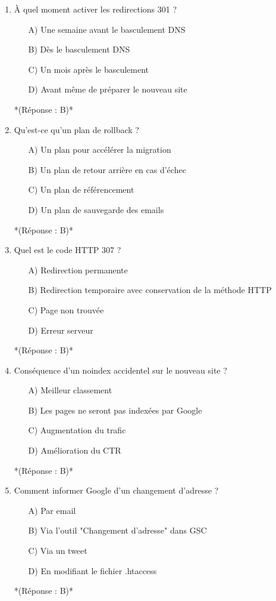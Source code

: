 \documentclass[12pt,a4paper,twoside]{report}
\begin{document}
\begin{enumerate}
\item À quel moment activer les redirections 301 ?
\begin{itemize}
\item[A)] Une semaine avant le basculement DNS
\item[B)] Dès le basculement DNS
\item[C)] Un mois après le basculement
\item[D)] Avant même de préparer le nouveau site
\end{itemize}
*(Réponse : B)*

\item Qu'est-ce qu'un plan de rollback ?
\begin{itemize}
\item[A)] Un plan pour accélérer la migration
\item[B)] Un plan de retour arrière en cas d'échec
\item[C)] Un plan de référencement
\item[D)] Un plan de sauvegarde des emails
\end{itemize}
*(Réponse : B)*

\item Quel est le code HTTP 307 ?
\begin{itemize}
\item[A)] Redirection permanente
\item[B)] Redirection temporaire avec conservation de la méthode HTTP
\item[C)] Page non trouvée
\item[D)] Erreur serveur
\end{itemize}
*(Réponse : B)*

\item Conséquence d'un noindex accidentel sur le nouveau site ?
\begin{itemize}
\item[A)] Meilleur classement
\item[B)] Les pages ne seront pas indexées par Google
\item[C)] Augmentation du trafic
\item[D)] Amélioration du CTR
\end{itemize}
*(Réponse : B)*

\item Comment informer Google d'un changement d'adresse ?
\begin{itemize}
\item[A)] Par email
\item[B)] Via l'outil "Changement d'adresse" dans GSC
\item[C)] Via un tweet
\item[D)] En modifiant le fichier .htaccess
\end{itemize}
*(Réponse : B)*


\end{enumerate}
\end{document}
